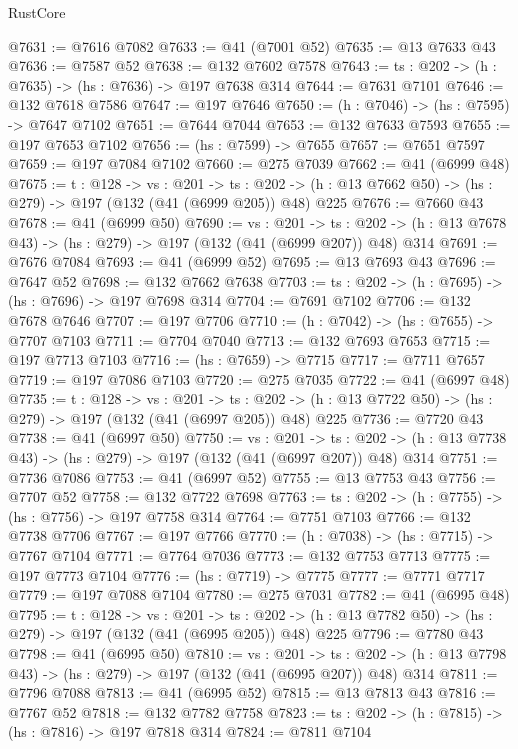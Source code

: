 \begin{lexlean}{RustCore}
\begin{coremodule}
@7631 := @7616 @7082
@7633 := @41 (@7001 @52)
@7635 := @13 @7633 @43
@7636 := @7587 @52
@7638 := @132 @7602 @7578
@7643 := {ts : @202} -> (h : @7635) -> (hs : @7636) -> @197 @7638 @314
@7644 := @7631 @7101
@7646 := @132 @7618 @7586
@7647 := @197 @7646
@7650 := (h : @7046) -> (hs : @7595) -> @7647 @7102
@7651 := @7644 @7044
@7653 := @132 @7633 @7593
@7655 := @197 @7653 @7102
@7656 := (hs : @7599) -> @7655
@7657 := @7651 @7597
@7659 := @197 @7084 @7102
@7660 := @275 @7039
@7662 := @41 (@6999 @48)
@7675 := {t : @128} ->
  {vs : @201} ->
  {ts : @202} -> (h : @13 @7662 @50) -> (hs : @279) -> @197 (@132 (@41 (@6999 @205)) @48) @225
@7676 := @7660 @43
@7678 := @41 (@6999 @50)
@7690 := {vs : @201} ->
  {ts : @202} -> (h : @13 @7678 @43) -> (hs : @279) -> @197 (@132 (@41 (@6999 @207)) @48) @314
@7691 := @7676 @7084
@7693 := @41 (@6999 @52)
@7695 := @13 @7693 @43
@7696 := @7647 @52
@7698 := @132 @7662 @7638
@7703 := {ts : @202} -> (h : @7695) -> (hs : @7696) -> @197 @7698 @314
@7704 := @7691 @7102
@7706 := @132 @7678 @7646
@7707 := @197 @7706
@7710 := (h : @7042) -> (hs : @7655) -> @7707 @7103
@7711 := @7704 @7040
@7713 := @132 @7693 @7653
@7715 := @197 @7713 @7103
@7716 := (hs : @7659) -> @7715
@7717 := @7711 @7657
@7719 := @197 @7086 @7103
@7720 := @275 @7035
@7722 := @41 (@6997 @48)
@7735 := {t : @128} ->
  {vs : @201} ->
  {ts : @202} -> (h : @13 @7722 @50) -> (hs : @279) -> @197 (@132 (@41 (@6997 @205)) @48) @225
@7736 := @7720 @43
@7738 := @41 (@6997 @50)
@7750 := {vs : @201} ->
  {ts : @202} -> (h : @13 @7738 @43) -> (hs : @279) -> @197 (@132 (@41 (@6997 @207)) @48) @314
@7751 := @7736 @7086
@7753 := @41 (@6997 @52)
@7755 := @13 @7753 @43
@7756 := @7707 @52
@7758 := @132 @7722 @7698
@7763 := {ts : @202} -> (h : @7755) -> (hs : @7756) -> @197 @7758 @314
@7764 := @7751 @7103
@7766 := @132 @7738 @7706
@7767 := @197 @7766
@7770 := (h : @7038) -> (hs : @7715) -> @7767 @7104
@7771 := @7764 @7036
@7773 := @132 @7753 @7713
@7775 := @197 @7773 @7104
@7776 := (hs : @7719) -> @7775
@7777 := @7771 @7717
@7779 := @197 @7088 @7104
@7780 := @275 @7031
@7782 := @41 (@6995 @48)
@7795 := {t : @128} ->
  {vs : @201} ->
  {ts : @202} -> (h : @13 @7782 @50) -> (hs : @279) -> @197 (@132 (@41 (@6995 @205)) @48) @225
@7796 := @7780 @43
@7798 := @41 (@6995 @50)
@7810 := {vs : @201} ->
  {ts : @202} -> (h : @13 @7798 @43) -> (hs : @279) -> @197 (@132 (@41 (@6995 @207)) @48) @314
@7811 := @7796 @7088
@7813 := @41 (@6995 @52)
@7815 := @13 @7813 @43
@7816 := @7767 @52
@7818 := @132 @7782 @7758
@7823 := {ts : @202} -> (h : @7815) -> (hs : @7816) -> @197 @7818 @314
@7824 := @7811 @7104

\end{coremodule}
\end{lexlean}
